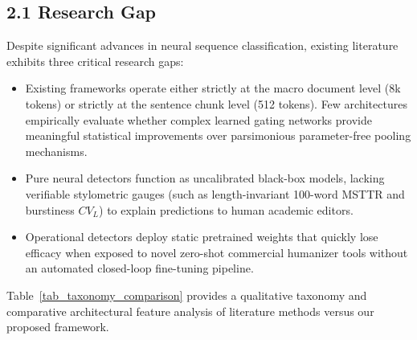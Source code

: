 \documentclass[conference]{IEEEtran}
\begin{document}
\subsection{2.1 Research Gap}
Despite significant advances in neural sequence classification, existing literature exhibits three critical research gaps:
\begin{itemize}
    \item Existing frameworks operate either strictly at the macro document level (8k tokens) or strictly at the sentence chunk level (512 tokens). Few architectures empirically evaluate whether complex learned gating networks provide meaningful statistical improvements over parsimonious parameter-free pooling mechanisms.
    \item Pure neural detectors function as uncalibrated black-box models, lacking verifiable stylometric gauges (such as length-invariant 100-word MSTTR and burstiness $CV_L$) to explain predictions to human academic editors.
    \item Operational detectors deploy static pretrained weights that quickly lose efficacy when exposed to novel zero-shot commercial humanizer tools without an automated closed-loop fine-tuning pipeline.
\end{itemize}

Table~\ref{tab_taxonomy_comparison} provides a qualitative taxonomy and comparative architectural feature analysis of literature methods versus our proposed framework.
\end{document}

